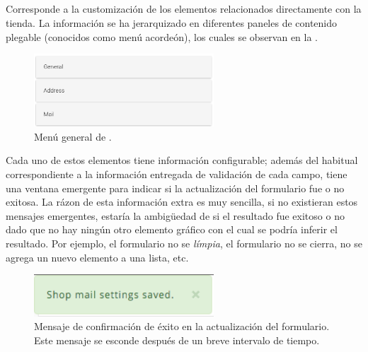 \subsection{\ecomFrameworkCoreEF}

Corresponde a la customización de los elementos relacionados directamente con la tienda. La información se ha jerarquizado en diferentes paneles de contenido plegable (conocidos como menú acordeón), los cuales se observan en la .
\begin{figure}[H]
	\centering
	\includegraphics[width=0.6\textwidth]{figuras/dashboard/ecommerce/main_menu.png}
	\caption{Menú general de \ecomFrameworkCoreEF.}
	\label{figure:dashboard:ecommerce:main_menu}
\end{figure}

Cada uno de estos elementos tiene información configurable; además del \feedback habitual correspondiente a la información entregada de validación de cada campo, tiene una ventana emergente para indicar si la actualización del formulario fue o no exitosa.
La rázon de esta información extra es muy sencilla, si no existieran estos mensajes emergentes, estaría la ambigüedad de si el resultado fue exitoso o no dado que no hay ningún otro elemento gráfico con el cual se podría inferir el resultado. Por ejemplo, el formulario no se \textit{límpia}, el formulario no se cierra, no se agrega un nuevo elemento a una lista, etc.

\begin{figure}[H]
	\centering
	\includegraphics[width=0.6\textwidth]{figuras/dashboard/ecommerce/success_message.png}
	\caption{Mensaje de confirmación de éxito en la actualización del formulario. Este mensaje se esconde después de un breve intervalo de tiempo.}
	\label{figure:dashboard:ecommerce:success_message}
\end{figure}

